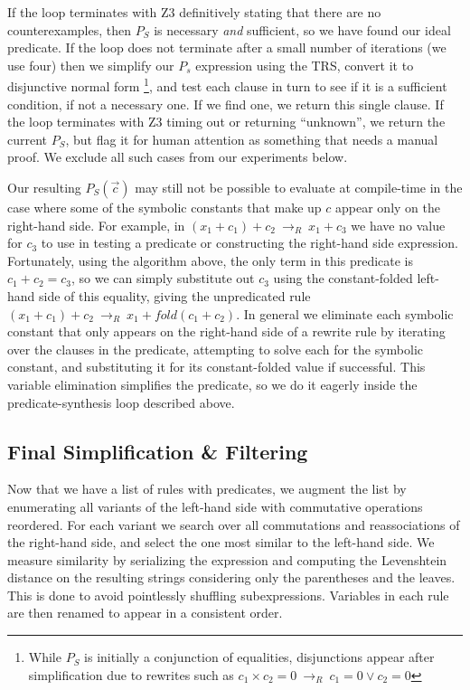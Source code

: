 \documentclass[acmsmall,review]{acmart}\settopmatter{printfolios=true,printccs=false,printacmref=false}
\newcommand{\rewrites}[0]{\:\rightarrow_{R}\:}
\begin{document}
If the loop terminates with Z3 definitively stating that there are
no counterexamples, then $P_S$ is necessary \emph{and} sufficient, so
we have found our ideal predicate. If the loop does not terminate
after a small number of iterations (we use four) then we simplify our
$P_s$ expression using the TRS, convert it to disjunctive normal
form \footnote{While $P_S$ is initially a conjunction of equalities,
  disjunctions appear after simplification due to rewrites such as
  $c_1 \times c_2 = 0 \rewrites c_1 = 0 \vee c_2 = 0$}, and test
each clause in turn to see if it is a sufficient condition, if not a
necessary one. If we find one, we return this single clause. If the
loop terminates with Z3 timing out or returning ``unknown'', we return
the current $P_S$, but flag it for human attention as something that
needs a manual proof. We exclude all such cases from our experiments
below.

Our resulting $P_S(\vec{c})$ may still not be possible to evaluate at
compile-time in the case where some of the symbolic constants that
make up $c$ appear only on the right-hand side. For example, in $(x_1
+ c_1) + c_2 \rewrites x_1 + c_3$ we have no value for $c_3$ to use
in testing a predicate or constructing the right-hand side
expression. Fortunately, using the algorithm above, the only term in
this predicate is $c_1 + c_2 = c_3$, so we can simply substitute out
$c_3$ using the constant-folded left-hand side of this equality,
giving the unpredicated rule $(x_1 + c_1) + c_2 \rewrites x_1 +
fold(c_1 + c_2)$. In general we eliminate each symbolic constant that
only appears on the right-hand side of a rewrite rule by iterating
over the clauses in the predicate, attempting to solve each for the
symbolic constant, and substituting it for its constant-folded value
if successful. This variable elimination simplifies the predicate, so
we do it eagerly inside the predicate-synthesis loop described above.

\subsection{Final Simplification \& Filtering}

Now that we have a list of rules with predicates, we augment the list
by enumerating all variants of the left-hand side with commutative
operations reordered. For each variant we search over all commutations
and reassociations of the right-hand side, and select the one most
similar to the left-hand side. We measure similarity by serializing
the expression and computing the Levenshtein distance on the resulting
strings considering only the parentheses and the leaves. This is done
to avoid pointlessly shuffling subexpressions. Variables in each rule
are then renamed to appear in a consistent order.
\end{document}

